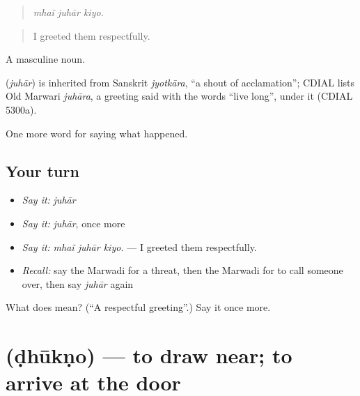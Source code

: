 \begin{quote}
  
\end{quote}

\begin{quote}
\emph{mhaĩ juhār kiyo.}
\end{quote}

\begin{quote}
I greeted them respectfully.
\end{quote}

A masculine noun.

\begin{cousinweb}
\textbf{} (\emph{juhār}) is inherited from Sanskrit \emph{jyotkāra}, \textquotedblleft{}a shout of acclamation\textquotedblright{}; CDIAL lists Old Marwari \emph{juhāra}, a greeting said with the words \textquotedblleft{}live long\textquotedblright{}, under it (CDIAL 5300a).
\end{cousinweb}

\begin{grammarlens}[title={What you've built}]
One more word for saying what happened.
\end{grammarlens}

\subsection*{Your turn}
\begin{itemize}
\raggedright
  \item \emph{Say it:} \emph{juhār}
  \item \emph{Say it:} \emph{juhār}, once more
  \item \emph{Say it:} \emph{mhaĩ juhār kiyo.} — I greeted them respectfully.
  \item \emph{Recall:} say the Marwadi for a threat, then the Marwadi for to call someone over, then say \emph{juhār} again
\end{itemize}

\begin{tcolorbox}[breakable,colback=teal!4,colframe=teal!35!black,title={Before you move on}]
What does  mean? (\textquotedblleft{}A respectful greeting\textquotedblright{}.) Say it once more.
\end{tcolorbox}
\section[\texorpdfstring{\mw{ढूकणो} (ḍhūkṇo)}{ढूकणो (ḍhūkṇo)}]{ (ḍhūkṇo) — to draw near; to arrive at the door}

